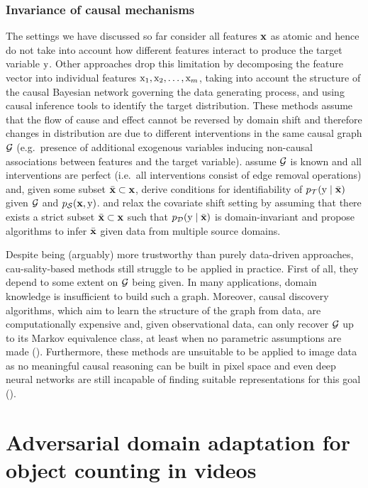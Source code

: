 \subsubsection{Invariance of causal mechanisms}
\label{sec:causal_da_sota}
The settings we have discussed so far consider all features ${\mathbf{x}}$ as atomic and hence do not take into account how different features interact to produce the target variable ${\textnormal{y}}$.  Other approaches drop this limitation by decomposing the feature vector into individual features ${\textnormal{x}}_1,{\textnormal{x}}_2,\dots,{\textnormal{x}}_m$, taking into account the structure of the causal Bayesian network governing the data generating process, and using causal inference tools to identify the target distribution. These methods assume that the flow of cause and effect cannot be reversed by domain shift and therefore changes in distribution are due to different interventions in the same causal graph ${\mathcal{G}}$ (e.g.\ presence of additional exogenous variables inducing non-causal associations between features and the target variable). \citet{Bareinboim2016} assume ${\mathcal{G}}$ is known and all interventions are perfect (i.e.\ all interventions consist of edge removal operations) and, given some subset $\bar{{\mathbf{x}}} \subset {\mathbf{x}}$, derive conditions for identifiability of $p_{\mathcal{T}}({\textnormal{y}} \mid \bar{{\mathbf{x}}})$ given ${\mathcal{G}}$ and $p_{\mathcal{S}}({\mathbf{x}}, {\textnormal{y}})$. \citet{Rojas2018} and \citet{Magliacane2018} relax the covariate shift setting by assuming that there exists a strict subset $\bar{{\mathbf{x}}} \subset {\mathbf{x}}$ such that $p_{\mathcal{D}}({\textnormal{y}} \mid \bar{{\mathbf{x}}})$ is domain-invariant and propose algorithms to infer $\bar{{\mathbf{x}}}$ given data from multiple source domains.

Despite being (arguably) more trustworthy than purely data-driven approaches, cau-\allowbreak sality-based methods still struggle to be applied in practice. First of all, they depend to some extent on ${\mathcal{G}}$ being given. In many applications, domain knowledge is insufficient to build such a graph. Moreover, causal discovery algorithms, which aim to learn the structure of the graph from data, are computationally expensive and, given observational data, can only recover ${\mathcal{G}}$ up to its Markov equivalence class, at least when no parametric assumptions are made  (\citet{Peters2014}). Furthermore, these methods are unsuitable to be applied to image data as no meaningful causal reasoning can be built in pixel space and even deep neural networks are still incapable of finding suitable representations for this goal (\citet{Scholkopf2021}).

\section{Adversarial domain adaptation for object counting in videos}
\label{sec:da_sensors}

